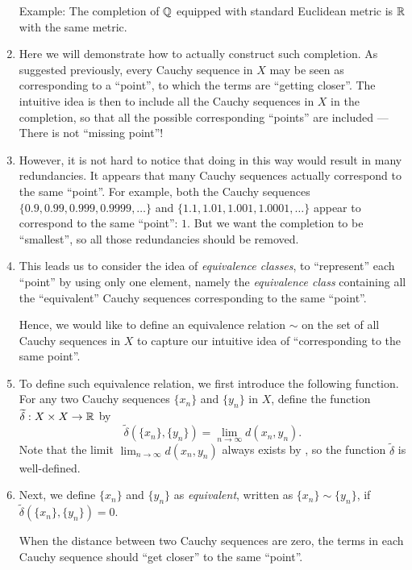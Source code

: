 \begin{enumerate}
Example: The completion of \(\mathbb{Q}\) equipped with standard Euclidean metric is
\(\mathbb{R}\) with the same metric.

\item Here we will demonstrate how to actually construct such completion.
As suggested previously, every Cauchy sequence in \(X\) may be seen as
corresponding to a ``point'', to which the terms are ``getting closer''. The
intuitive idea is then to include all the Cauchy sequences in \(X\) in the
completion, so that all the possible corresponding ``points'' are included ---
There is not ``missing point''!

\item However, it is not hard to notice that doing in this way would result in
many redundancies. It appears that many Cauchy sequences actually correspond to
the same ``point''. For example, both the Cauchy sequences \(\{0.9, 0.99,
0.999, 0.9999, \dotsc\}\) and \(\{1.1, 1.01, 1.001, 1.0001, \dotsc\}\) appear
to correspond to the same ``point'': \(1\). But we want the completion to be
``smallest'', so all those redundancies should be removed.

\item This leads us to consider the idea of \emph{equivalence classes}, to
``represent'' each ``point'' by using only one element, namely the
\emph{equivalence class} containing all the ``equivalent'' Cauchy sequences
corresponding to the same ``point''.

Hence, we would like to define an equivalence relation \(\sim\) on the set of
all Cauchy sequences in \(X\) to capture our intuitive idea of ``corresponding
to the same point''.

\item To define such equivalence relation, we first introduce the following
function. For any two Cauchy sequences \(\{x_n\}\) and \(\{y_n\}\) in \(X\),
define the function
\(\widetilde{\delta}:X\times X\to\mathbb{R}\) by
\[\widetilde{\delta}(\{x_n\},\{y_n\})=\lim_{n\to \infty}d(x_n,y_n).\]
Note that the limit \(\lim_{n\to \infty}d(x_n,y_n)\) always exists by
, so the function \(\widetilde{\delta}\) is well-defined.

\item Next, we define \(\{x_n\}\) and \(\{y_n\}\) as \emph{equivalent}, written
as \(\{x_n\}\sim\{y_n\}\), if \(\widetilde{\delta}(\{x_n\},\{y_n\})=0\).

\begin{intuition} When the distance between two Cauchy sequences are zero, the
terms in each Cauchy sequence should ``get closer'' to the same ``point''.
\end{intuition}



\end{enumerate}
